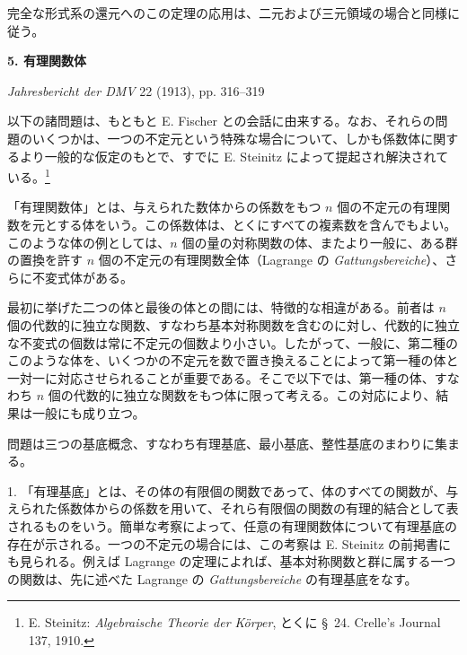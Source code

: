 \documentclass[11pt]{article}
\begin{document}
完全な形式系の還元へのこの定理の応用は、二元および三元領域の場合と同様に従う。

\clearpage
\providecommand{\Kfield}{\mathfrak{K}}
\providecommand{\Ssys}{\mathfrak{S}}
\providecommand{\Mfield}{\mathfrak{M}}
\providecommand{\tq}{\tau}
\providecommand{\Lsys}{\mathfrak{L}}
\providecommand{\Jdom}{\mathfrak{J}}
\providecommand{\ds}{\displaystyle}

\begin{center}
{\Large\bfseries 5. 有理関数体}\par
\vspace{1.2em}
\emph{Jahresbericht der DMV} 22 (1913), pp. 316--319
\end{center}

\vspace{1.5em}

以下の諸問題は、もともと E. Fischer との会話に由来する。なお、それらの問題のいくつかは、一つの不定元という特殊な場合について、しかも係数体に関するより一般的な仮定のもとで、すでに E. Steinitz によって提起され解決されている。\footnote{E. Steinitz: \emph{Algebraische Theorie der Körper}, とくに \S\ 24. Crelle's Journal 137, 1910.}

「有理関数体」とは、与えられた数体からの係数をもつ $n$ 個の不定元の有理関数を元とする体をいう。この係数体は、とくにすべての複素数を含んでもよい。このような体の例としては、$n$ 個の量の対称関数の体、またより一般に、ある群の置換を許す $n$ 個の不定元の有理関数全体（Lagrange の \emph{Gattungsbereiche}）、さらに不変式体がある。

最初に挙げた二つの体と最後の体との間には、特徴的な相違がある。前者は $n$ 個の代数的に独立な関数、すなわち基本対称関数を含むのに対し、代数的に独立な不変式の個数は常に不定元の個数より小さい。したがって、一般に、第二種のこのような体を、いくつかの不定元を数で置き換えることによって第一種の体と一対一に対応させられることが重要である。そこで以下では、第一種の体、すなわち $n$ 個の代数的に独立な関数をもつ体に限って考える。この対応により、結果は一般にも成り立つ。

問題は三つの基底概念、すなわち有理基底、最小基底、整性基底のまわりに集まる。

1. 「有理基底」とは、その体の有限個の関数であって、体のすべての関数が、与えられた係数体からの係数を用いて、それら有限個の関数の有理的結合として表されるものをいう。簡単な考察によって、任意の有理関数体について有理基底の存在が示される。一つの不定元の場合には、この考察は E. Steinitz の前掲書にも見られる。例えば Lagrange の定理によれば、基本対称関数と群に属する一つの関数は、先に述べた Lagrange の \emph{Gattungsbereiche} の有理基底をなす。
\end{document}
